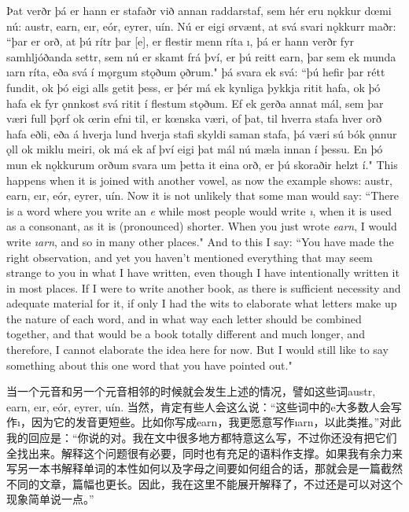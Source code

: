 \begin{paracol}{2}
  Þat verðr þá er hann er stafaðr við annan raddarstaf, sem hér eru nǫkkur dœmi nú: austr, earn, eır, eór, eyrer, uín. Nú er eigi ørvænt, at svá svari nǫkkurr maðr: ``þar er orð, at þú rítr þar [e], er flestir menn ríta ı, þá er hann verðr fyr samhljóðanda settr, sem nú er skamt frá því, er þú reitt earn, þar sem ek munda ıarn ríta, eða svá í mǫrgum stǫðum ǫðrum." þá svara ek svá: ``þú hefir þar rétt fundit, ok þó eigi alls getit þess, er þér má ek kynliga þykkja ritit hafa, ok þó hafa ek fyr ǫnnkost svá ritit í flestum stǫðum. Ef ek gerða annat mál, sem þar væri full þǫrf ok œrin efni til, er kœnska væri, of þat, til hverra stafa hver orð hafa eðli, eða á hverja lund hverja stafi skyldi saman stafa, þá væri sú bók ǫnnur ǫll ok miklu meiri, ok má ek af því eigi þat mál nú mæla innan í þessu. En þó mun ek nǫkkurum orðum svara um þetta it eina orð, er þú skoraðir helzt í."
  \switchcolumn
  This happens when it is joined with another vowel, as now the example shows: austr, earn, eır, eór, eyrer, uín. Now it is not unlikely that some man would say: ``There is a word where you write an \textit{e} while most people would write \textit{ı}, when it is used as a consonant, as it is (pronounced) shorter. When you just wrote \textit{earn}, I would write \textit{ıarn}, and so in many other places." And to this I say: ``You have made the right observation, and yet you haven't mentioned everything that may seem strange to you in what I have written, even though I have intentionally written it in most places. If I were to write another book, as there is sufficient necessity and adequate material for it, if only I had the wits to elaborate what letters make up the nature of each word, and in what way each letter should be combined together, and that would be a book totally different and much longer, and therefore, I cannot elaborate the idea here for now. But I would still like to say something about this one word that you have pointed out."
\end{paracol}
\begin{translation*}{}
  当一个元音和另一个元音相邻的时候就会发生上述的情况，譬如这些词austr, earn, eır, eór, eyrer, uín. 当然，肯定有些人会这么说：“这些词中的e大多数人会写作ı，因为它的发音更短些。比如你写成earn，我更愿意写作ıarn，以此类推。”对此我的回应是：“你说的对。我在文中很多地方都特意这么写，不过你还没有把它们全找出来。解释这个问题很有必要，同时也有充足的语料作支撑。如果我有余力来写另一本书解释单词的本性如何以及字母之间要如何组合的话，那就会是一篇截然不同的文章，篇幅也更长。因此，我在这里不能展开解释了，不过还是可以对这个现象简单说一点。”
\end{translation*}
